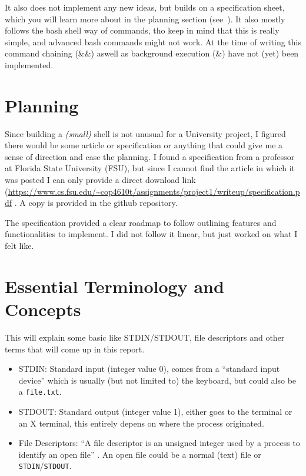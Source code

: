 \documentclass[12pt,english]{article}
\begin{document}
It also does not implement any new ideas, but builds on a
specification sheet, which you will learn more about in the
planning section (see~). It also mostly
follows the bash shell way of commands, tho keep in mind
that this is really simple, and advanced bash commands might
not work. At the time of writing this command chaining (\&\&)
aswell as background execution (\&) have not (yet) been implemented.


\section{Planning} \label{sec:planning}
Since building a \textit{(small)} shell is not unusual for a University
project, I figured there would be some article or specification or
anything that could give me a sense of direction and ease the
planning. I found a specification from a professor at Florida
State University (FSU), but since I cannot find the article in
which it was posted I can only provide a direct download link
(\url{https://www.cs.fsu.edu/~cop4610t/assignments/project1/writeup/specification.pdf}
. A copy is provided in the github repository.

The specification provided a clear roadmap to follow outlining
features and functionalities to implement.
I did not follow it linear, but
just worked on what I felt like. 


\section{Essential Terminology and Concepts}
This will explain some basic like \textsc{STDIN/STDOUT}, file
descriptors and other terms that will come up in this
report.
\begin{itemize}
\item STDIN: Standard input (integer value \textsc{0}), comes
  from a ``standard input device'' which is usually
  (but not limited to) the keyboard, but could also be a
  \texttt{file.txt}.
\item STDOUT: Standard output (integer value \textsc{1}),
  either goes to the terminal or an X terminal, this 
  entirely depens on where the process originated.
\item File Descriptors: ``A file descriptor is an unsigned
  integer used by a process to identify an open file'' \cite{AIX2025}. An open file could be a normal (text) file or
  \texttt{STDIN}/\texttt{STDOUT}.
\end{itemize}~\cite{StdinStdoutStderr}
\end{document}
